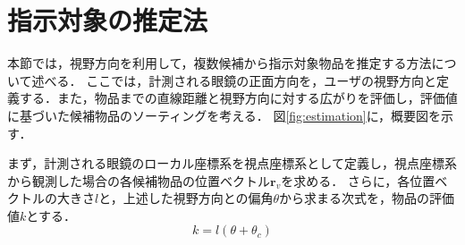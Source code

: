 \section{指示対象の推定法}
本節では，視野方向を利用して，複数候補から指示対象物品を推定する方法について述べる．
ここでは，計測される眼鏡の正面方向を，ユーザの視野方向と定義する．また，物品までの直線距離と視野方向に対する広がりを評価し，評価値に基づいた候補物品のソーティングを考える．
図{\ref{fig:estimation}}に，概要図を示す．

まず，計測される眼鏡のローカル座標系を視点座標系として定義し，視点座標系から観測した場合の各候補物品の位置ベクトル$ \bm{r}_v $を求める．
さらに，各位置ベクトルの大きさ$ l $と，上述した視野方向との偏角$ \theta $から求まる次式を，物品の評価値$ k $とする．
%
\begin{equation}
\label{eq:sort_key}
{
  k = l (\theta + \theta_{c})
}
\end{equation}

